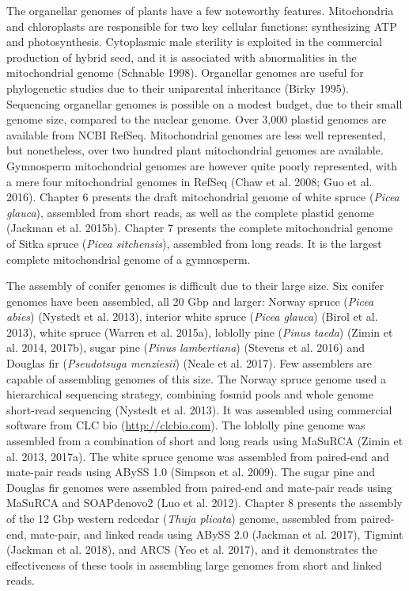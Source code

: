 \documentclass[
  12pt,
  oneside,
  openany]{book}
\begin{document}
The organellar genomes of plants have a few noteworthy features. Mitochondria and chloroplasts are responsible for two key cellular functions: synthesizing ATP and photosynthesis. Cytoplasmic male sterility is exploited in the commercial production of hybrid seed, and it is associated with abnormalities in the mitochondrial genome (Schnable 1998). Organellar genomes are useful for phylogenetic studies due to their uniparental inheritance (Birky 1995). Sequencing organellar genomes is possible on a modest budget, due to their small genome size, compared to the nuclear genome. Over 3,000 plastid genomes are available from NCBI RefSeq. Mitochondrial genomes are less well represented, but nonetheless, over two hundred plant mitochondrial genomes are available. Gymnosperm mitochondrial genomes are however quite poorly represented, with a mere four mitochondrial genomes in RefSeq (Chaw et al. 2008; Guo et al. 2016). Chapter 6 presents the draft mitochondrial genome of white spruce (\emph{Picea glauca}), assembled from short reads, as well as the complete plastid genome (Jackman et al. 2015b). Chapter 7 presents the complete mitochondrial genome of Sitka spruce (\emph{Picea sitchensis}), assembled from long reads. It is the largest complete mitochondrial genome of a gymnosperm.

The assembly of conifer genomes is difficult due to their large size. Six conifer genomes have been assembled, all 20 Gbp and larger: Norway spruce (\emph{Picea abies}) (Nystedt et al. 2013), interior white spruce (\emph{Picea glauca}) (Birol et al. 2013), white spruce (Warren et al. 2015a), loblolly pine (\emph{Pinus taeda}) (Zimin et al. 2014, 2017b), sugar pine (\emph{Pinus lambertiana}) (Stevens et al. 2016) and Douglas fir (\emph{Pseudotsuga menziesii}) (Neale et al. 2017). Few assemblers are capable of assembling genomes of this size. The Norway spruce genome used a hierarchical sequencing strategy, combining fosmid pools and whole genome short-read sequencing (Nystedt et al. 2013). It was assembled using commercial software from CLC bio (\url{http://clcbio.com}). The loblolly pine genome was assembled from a combination of short and long reads using MaSuRCA (Zimin et al. 2013, 2017a). The white spruce genome was assembled from paired-end and mate-pair reads using ABySS 1.0 (Simpson et al. 2009). The sugar pine and Douglas fir genomes were assembled from paired-end and mate-pair reads using MaSuRCA and SOAPdenovo2 (Luo et al. 2012). Chapter 8 presents the assembly of the 12 Gbp western redcedar (\emph{Thuja plicata}) genome, assembled from paired-end, mate-pair, and linked reads using ABySS 2.0 (Jackman et al. 2017), Tigmint (Jackman et al. 2018), and ARCS (Yeo et al. 2017), and it demonstrates the effectiveness of these tools in assembling large genomes from short and linked reads.
\end{document}
